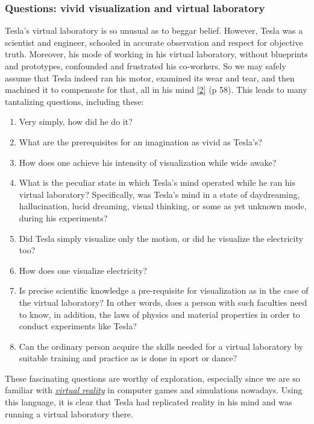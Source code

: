 \documentclass[
  12pt,
  british,
  a4paper,
  rgb,
  dvipsnames,
  svgnames,
  hyphens]{article}
\providecommand{\tightlist}{%
  \setlength{\itemsep}{0pt}\setlength{\parskip}{0pt}}
\begin{document}
\hypertarget{questions-vivid-visualization-and-virtual-laboratory}{%
\subsubsection{Questions: vivid visualization and virtual
laboratory}\label{questions-vivid-visualization-and-virtual-laboratory}}

Tesla's virtual laboratory is so unusual as to beggar belief. However,
Tesla was a scientist and engineer, schooled in accurate observation and
respect for objective truth. Moreover, his mode of working in his
virtual laboratory, without blueprints and prototypes, confounded and
frustrated his co-workers. So we may safely assume that Tesla indeed ran
his motor, examined its wear and tear, and then machined it to
compensate for that, all in his mind
\protect\hyperlink{ref-oneill80}{{[}2{]}} (p 58). This leads to many
tantalizing questions, including these:

\begin{enumerate}
\tightlist
\item
  Very simply, how did he do it?
\item
  What are the prerequisites for an imagination as vivid as Tesla's?
\item
  How does one achieve his intensity of visualization while wide awake?
\item
  What is the peculiar state in which Tesla's mind operated while he ran
  his virtual laboratory? Specifically, was Tesla's mind in a state of
  daydreaming, hallucination, lucid dreaming, visual thinking, or some
  as yet unknown mode, during his experiments?
\item
  Did Tesla simply visualize only the motion, or did he visualize the
  electricity too?
\item
  How does one visualize electricity?
\item
  Is precise scientific knowledge a pre-requisite for visualization as
  in the case of the virtual laboratory? In other words, does a person
  with such faculties need to know, in addition, the laws of physics and
  material properties in order to conduct experiments like Tesla?
\item
  Can the ordinary person acquire the skills needed for a virtual
  laboratory by suitable training and practice as is done in sport or
  dance?
\end{enumerate}

These fascinating questions are worthy of exploration, especially since
we are so familiar with
\href{https://en.wikipedia.org/wiki/Virtual_reality}{\emph{virtual
reality}} in computer games and simulations nowadays. Using this
language, it is clear that Tesla had replicated reality in his mind and
was running a virtual laboratory there.
\end{document}
